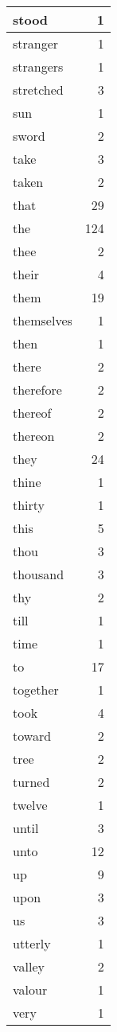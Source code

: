 \begin{center}
\begin{longtable}{l|r}
stood & 1\\ \hline 
stranger & 1\\ \hline 
strangers & 1\\ \hline 
stretched & 3\\ \hline 
sun & 1\\ \hline 
sword & 2\\ \hline 
take & 3\\ \hline 
taken & 2\\ \hline 
that & 29\\ \hline 
the & 124\\ \hline 
thee & 2\\ \hline 
their & 4\\ \hline 
them & 19\\ \hline 
themselves & 1\\ \hline 
then & 1\\ \hline 
there & 2\\ \hline 
therefore & 2\\ \hline 
thereof & 2\\ \hline 
thereon & 2\\ \hline 
they & 24\\ \hline 
thine & 1\\ \hline 
thirty & 1\\ \hline 
this & 5\\ \hline 
thou & 3\\ \hline 
thousand & 3\\ \hline 
thy & 2\\ \hline 
till & 1\\ \hline 
time & 1\\ \hline 
to & 17\\ \hline 
together & 1\\ \hline 
took & 4\\ \hline 
toward & 2\\ \hline 
tree & 2\\ \hline 
turned & 2\\ \hline 
twelve & 1\\ \hline 
until & 3\\ \hline 
unto & 12\\ \hline 
up & 9\\ \hline 
upon & 3\\ \hline 
us & 3\\ \hline 
utterly & 1\\ \hline 
valley & 2\\ \hline 
valour & 1\\ \hline 
very & 1\\ \hline 

\end{longtable}
\end{center}
